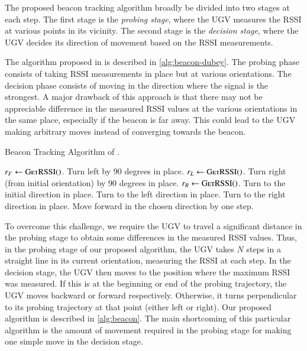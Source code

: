 \documentclass[conference]{IEEEtran}
\begin{document}
The proposed beacon tracking algorithm broadly be divided into two stages at
each step. The first stage is the \emph{probing stage}, where the UGV measures
the RSSI at various points in its vicinity. The second stage is the
\emph{decision stage}, where the UGV decides its direction of movement based on
the RSSI measurements.

The algorithm proposed in
\cite{sachinkumaromprakashdubeyNavigationCommunicationUGV2022} is described in
\autoref{alg:beacon-dubey}. The probing phase consists of taking RSSI
measurements in place but at various orientations. The decision phase consists
of moving in the direction where the signal is the strongest. A major drawback
of this approach is that there may not be appreciable difference in the measured
RSSI values at the various orientations in the same place, especially if the
beacon is far away. This could lead to the UGV making arbitrary moves instead of
converging towards the beacon.

\begin{algorithm}[H]
    \caption{Beacon Tracking Algorithm of \cite{sachinkumaromprakashdubeyNavigationCommunicationUGV2022}.}
    \label{alg:beacon-dubey}
    \begin{algorithmic}[1]
            \State \(r_F \gets \textsc{GetRSSI()}\).
            \State Turn left by 90 degrees in place.
            \State \(r_L \gets \textsc{GetRSSI()}\).
            \State Turn right (from initial orientation) by 90 degrees in place.
            \State \(r_R \gets \textsc{GetRSSI()}\).
                \State Turn to the initial direction in place.
                \State Turn to the left direction in place.
                \State Turn to the right direction in place.
            \EndIf
            \State Move forward in the chosen direction by one step.
        \EndWhile
    \end{algorithmic}
\end{algorithm}

To overcome this challenge, we require the UGV to travel a significant distance
in the probing stage to obtain some differences in the measured RSSI values.
Thus, in the probing stage of our proposed algorithm, the UGV takes \(N\) steps
in a straight line in its current orientation, measuring the RSSI at each step.
In the decision stage, the UGV then moves to the position where the maximum RSSI
was measured. If this is at the beginning or end of the probing trajectory, the
UGV moves backward or forward respectively. Otherwise, it turns perpendicular to
its probing trajectory at that point (either left or right). Our proposed
algorithm is described in \autoref{alg:beacon}. The main shortcoming of this
particular algorithm is the amount of movement required in the probing stage for
making one simple move in the decision stage.
\end{document}
